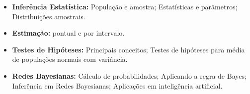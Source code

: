 \begin{itemize}
 \item \textbf{Inferência Estatística:} População e amostra; Estatísticas e parâmetros; Distribuições amostrais.
 
 \item \textbf{Estimação:} pontual e por intervalo.
 
 \item \textbf{Testes de Hipóteses:} Principais conceitos; Testes de hipóteses para média de populações normais com variância.
 
\item \textbf{Redes Bayesianas:} Cálculo de probabilidades; Aplicando a regra de Bayes; Inferência em Redes Bayesianas; Aplicações em inteligência artificial.
 
\end{itemize}




   


